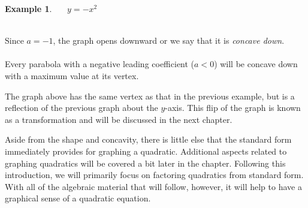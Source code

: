 \documentclass[12pt]{book}
\theoremstyle{definition}
\newtheorem{example}{Example}
\begin{document}
\newpage
\begin{multicols}{2}
\begin{example}~~~$y=-x^2$\\
\ \par
Since $a = -1$, the graph opens downward or we say that it is \textit{concave down}.\\
\\
Every parabola with a negative leading coefficient ($a<0$) will be concave down with a maximum value at its vertex.\\

\begin{center}
\end{center}
\end{example} 
\end{multicols}
The graph above has the same vertex as that in the previous example, but is a reflection of the previous graph about the $y$-axis. This flip of the graph is known as a transformation and will be discussed in the next chapter.\par
Aside from the shape and concavity, there is little else that the standard form immediately provides for graphing a quadratic.  Additional aspects related to graphing quadratics will be covered a bit later in the chapter.  Following this introduction, we will primarily focus on factoring quadratics from standard form.  With all of the algebraic material that will follow, however, it will help to have a graphical sense of a quadratic equation.
\end{document}
